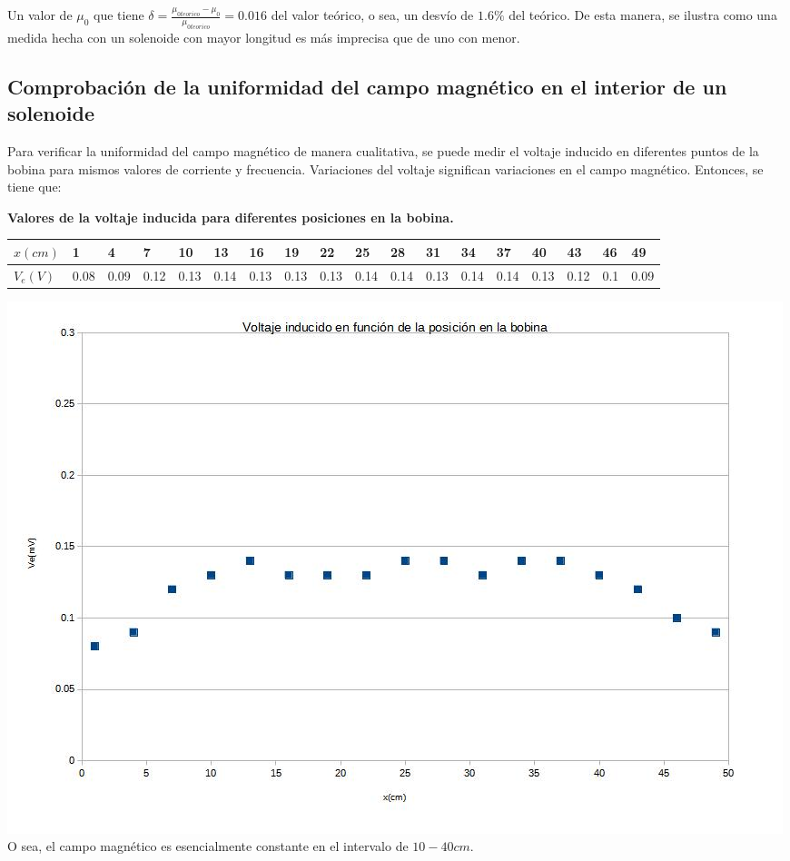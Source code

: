 \documentclass[a4paper,12pt]{article}
\begin{document}
Un valor de $\mu_0$ que tiene $\delta = \frac{\mu_{0teorico}-\mu_0}{\mu_{0teorico}} = 0.016$ del valor teórico, o sea, un desvío de $1.6\%$ del teórico. De esta manera, se ilustra como una medida hecha con un solenoide con mayor longitud es más imprecisa que de uno con menor.
 
\subsection{Comprobación de la uniformidad del campo magnético en el interior de un solenoide}
Para verificar la uniformidad del campo magnético de manera cualitativa, se puede medir el voltaje inducido en diferentes puntos de la bobina para mismos valores de corriente y frecuencia. Variaciones del voltaje significan variaciones en el campo magnético. Entonces, se tiene que:
\begin{center}
    \textbf{Valores de la voltaje inducida para diferentes posiciones en la bobina.}
\end{center}
\begin{table}[h!]
    \hskip-3.6cm
    \begin{tabular}{|l|l|l|l|l|l|l|l|l|l|l|l|l|l|l|l|l|l|}
    \hline
        $x(cm)$ & 1 & 4 & 7 & 10 & 13 & 16 & 19 & 22 & 25 & 28 & 31 & 34 & 37 & 40 & 43 & 46 & 49 \\ \hline
        $V_e(V)$ & 0.08 & 0.09 & 0.12 & 0.13 & 0.14 & 0.13 & 0.13 & 0.13 & 0.14 & 0.14 & 0.13 & 0.14 & 0.14 & 0.13 & 0.12 & 0.1 & 0.09 \\ \hline
    \end{tabular}
\end{table}

\includegraphics[width=\textwidth]{final.jpg}
O sea, el campo magnético es esencialmente constante en el intervalo de $10-40cm$.
\end{document}
